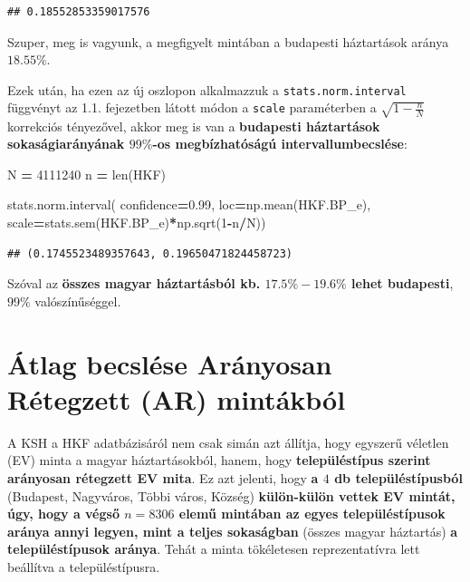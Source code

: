 \documentclass[
]{book}
\newenvironment{Shaded}{\begin{snugshade}}{\end{snugshade}}
\newcommand{\BuiltInTok}[1]{#1}
\newcommand{\DecValTok}[1]{\textcolor[rgb]{0.00,0.00,0.81}{#1}}
\newcommand{\FloatTok}[1]{\textcolor[rgb]{0.00,0.00,0.81}{#1}}
\newcommand{\NormalTok}[1]{#1}
\newcommand{\OperatorTok}[1]{\textcolor[rgb]{0.81,0.36,0.00}{\textbf{#1}}}
\begin{document}
\begin{verbatim}
## 0.18552853359017576
\end{verbatim}

Szuper, meg is vagyunk, a megfigyelt mintában a budapesti háztartások aránya \(18.55\%\).

Ezek után, ha ezen az új oszlopon alkalmazzuk a \texttt{stats.norm.interval} függvényt az 1.1. fejezetben látott módon a \texttt{scale} paraméterben a \(\sqrt{1-\frac{n}{N}}\) korrekciós tényezővel, akkor meg is van a \textbf{budapesti háztartások sokaságiarányának \(99\%\)-os megbízhatóságú intervallumbecslése}:

\begin{Shaded}
\begin{Highlighting}[]
\NormalTok{N }\OperatorTok{=} \DecValTok{4111240}
\NormalTok{n }\OperatorTok{=} \BuiltInTok{len}\NormalTok{(HKF)}

\NormalTok{stats.norm.interval(}
\NormalTok{  confidence}\OperatorTok{=}\FloatTok{0.99}\NormalTok{,}
\NormalTok{  loc}\OperatorTok{=}\NormalTok{np.mean(HKF.BP\_e),}
\NormalTok{  scale}\OperatorTok{=}\NormalTok{stats.sem(HKF.BP\_e)}\OperatorTok{*}\NormalTok{np.sqrt(}\DecValTok{1}\OperatorTok{{-}}\NormalTok{n}\OperatorTok{/}\NormalTok{N))}
\end{Highlighting}
\end{Shaded}

\begin{verbatim}
## (0.1745523489357643, 0.19650471824458723)
\end{verbatim}

Szóval az \textbf{összes magyar háztartásból kb. \(17.5\% - 19.6\%\) lehet budapesti}, \(99\%\) valószínűséggel.

\section{Átlag becslése Arányosan Rétegzett (AR) mintákból}\label{uxe1tlag-becsluxe9se-aruxe1nyosan-ruxe9tegzett-ar-mintuxe1kbuxf3l}

A KSH a HKF adatbázisáról nem csak simán azt állítja, hogy egyszerű véletlen (EV) minta a magyar háztartásokból, hanem, hogy \textbf{településtípus szerint arányosan rétegzett EV mita}. Ez azt jelenti, hogy \textbf{a \(4\) db településtípusból} (Budapest, Nagyváros, Többi város, Község) \textbf{külön-külön vettek EV mintát, úgy, hogy a végső \(n=8306\) elemű mintában az egyes településtípusok aránya annyi legyen, mint a teljes sokaságban} (összes magyar háztartás) \textbf{a településtípusok aránya}. Tehát a minta tökéletesen reprezentatívra lett beállítva a településtípusra.
\end{document}

